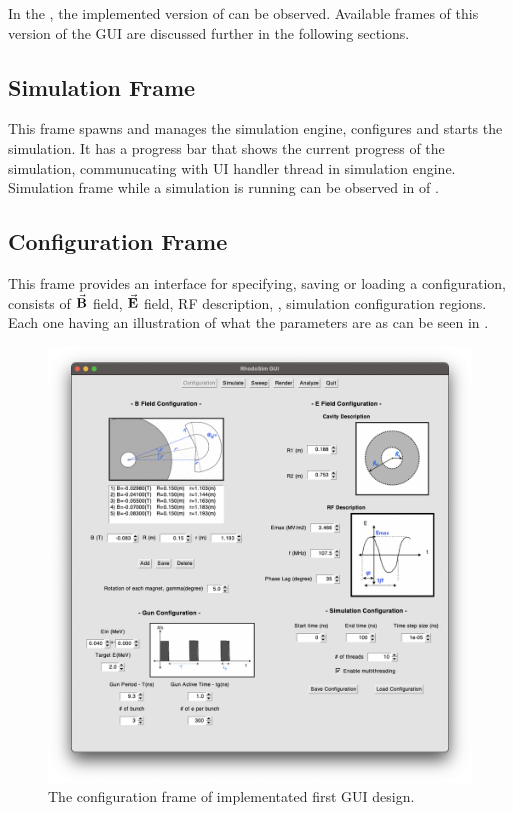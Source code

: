 \documentclass[a4paper,oneside,12pt]{report}
\numberwithin{equation}{chapter}
\begin{document}
{In the , the implemented version of  can be observed. 
Available frames of this version of the GUI are discussed further in the following sections.
\subsection{Simulation Frame}
This frame spawns and manages the simulation engine, configures and starts the simulation. 
It has a progress bar that shows the current progress of the simulation, communucating with UI handler thread in simulation engine.
Simulation frame while a simulation is running can be observed in  of .
\clearpage
\subsection{Configuration Frame}
This frame provides an interface for specifying, saving or loading a configuration, consists of $\vec{\textbf{B}}$ field, $\vec{\textbf{E}}$ field, RF description, \egun, simulation configuration regions.
Each one having an illustration of what the parameters are as can be seen in .
\vspace{10pt}
\begin{figure}[h]
    \centering
    \includegraphics[width=\linewidth]{./figures/rhodoSim/GUI_config_frame.png}
    \caption{The configuration frame of implementated first GUI design.}
    \label{fig:gui_config}
\end{figure}

}
\end{document}
